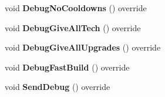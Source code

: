 \begin{DoxyCompactItemize}
void {\bfseries Debug\+No\+Cooldowns} () override
\item 
\mbox{\label{classsc2_1_1_debug_imp_a3e069d6aedf165657ad5343abf9ddb2e}} 
void {\bfseries Debug\+Give\+All\+Tech} () override
\item 
\mbox{\label{classsc2_1_1_debug_imp_a1a60068d317bf698568f09c8f53440c6}} 
void {\bfseries Debug\+Give\+All\+Upgrades} () override
\item 
\mbox{\label{classsc2_1_1_debug_imp_ae06fb891651e4d3df29f53d439cbf6d7}} 
void {\bfseries Debug\+Fast\+Build} () override
\item 
\mbox{\label{classsc2_1_1_debug_imp_ad746a9032fa3e1929e6253b721426fe2}} 
void {\bfseries Send\+Debug} () override
\end{DoxyCompactItemize}
